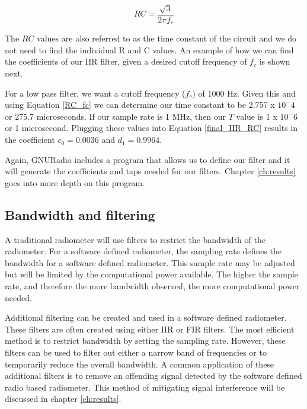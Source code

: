 \begin{equation}\label{RC_fc}
RC=\frac{\sqrt{3}}{2\pi f_c}
\end{equation}

The $RC$ values are also referred to as the time constant of the circuit and we do not need to find the individual R and C values.  An example of how we can find the coefficients of our IIR filter, given a desired cutoff frequency of $f_c$ is shown next.  

For a low pass filter, we want a cutoff frequency ($f_c$) of 1000 Hz.  Given this and using Equation \ref{RC_fc} we can determine our time constant to be 2.757 x $10^-4$ or 275.7 microseconds.  If our sample rate is 1 MHz, then our $T$ value is 1 x $10^-6$ or 1 microsecond.  Plugging these values into Equation \ref{final_IIR_RC} results in the coefficient $c_0 = 0.0036$ and $d_1=0.9964$.  

Again, GNURadio includes a program that allows us to define our filter and it will generate the coefficients and taps needed for our filters.  Chapter \ref{ch:results} goes into more depth on this program.



\subsection{Bandwidth and filtering}
A traditional radiometer will use filters to restrict the bandwidth of the radiometer.  For a software defined radiometer, the sampling rate defines the bandwidth for a software defined radiometer.  This sample rate may be adjusted but will be limited by the computational power available.  The higher the sample rate, and therefore the more bandwidth observed, the more computational power needed.  

Additional filtering can be created and used in a software defined radiometer.  These filters are often created using either IIR or FIR filters.  The most efficient method is to restrict bandwidth by setting the sampling rate.  However, these filters can be used to filter out either a narrow band of frequencies or to temporarily reduce the overall bandwidth.  A common application of these additional filters is to remove an offending signal detected by the software defined radio based radiometer.  This method of mitigating signal interference will be discussed in chapter \ref{ch:results}.

